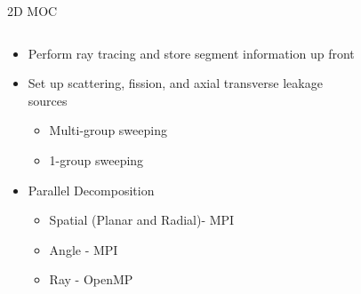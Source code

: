 \begin{frame}[t]{2D MOC}
  
  \begin{columns}
    \begin{column}{0.55\textwidth}
      \begin{itemize}
        \item Perform ray tracing and store segment information up front
        \item Set up scattering, fission, and axial transverse leakage sources
        \begin{itemize}
            \item Multi-group sweeping
          \item 1-group sweeping
        \end{itemize}
        \item Parallel Decomposition
        \begin{itemize}
          \item Spatial (Planar and Radial)- MPI
          \item Angle - MPI
          \item Ray - OpenMP
        \end{itemize}
      \end{itemize}
    \end{column}
    \begin{column}{0.45\textwidth}
      \begin{figure}[h]
        \centering
        \resizebox{!}{0.7\textheight}{}
      \end{figure}
    \end{column}
  \end{columns}

\end{frame}